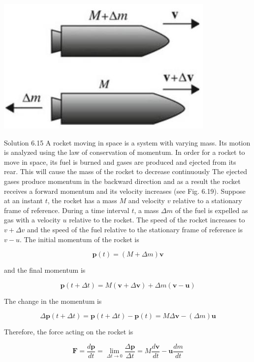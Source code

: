 \documentclass[10pt]{article}
\begin{document}
\begin{center}
\includegraphics[max width=\textwidth]{2024_09_13_db1f357d2aad0a03eb2eg-108}
\end{center}

Solution 6.15 A rocket moving in space is a system with varying mass. Its motion is analyzed using the law of conservation of momentum. In order for a rocket to move in space, its fuel is burned and gases are produced and ejected from its rear. This will cause the mass of the rocket to decrease continuously The ejected gases produce momentum in the backward direction and as a result the rocket receives a forward momentum and its velocity increases (see Fig. 6.19). Suppose at an instant $t$, the rocket has a mass $M$ and velocity $v$ relative to a stationary frame of reference. During a time interval $t$, a mass $\Delta m$ of the fuel is expelled as gas with a velocity $u$ relative to the rocket. The speed of the rocket increases to $v+\Delta v$ and the speed of the fuel relative to the stationary frame of reference is $v-u$. The initial momentum of the rocket is

$$
\mathbf{p}(t)=(M+\Delta m) \mathbf{v}
$$

and the final momentum is

$$
\mathbf{p}(t+\Delta t)=M(\mathbf{v}+\Delta \mathbf{v})+\Delta m(\mathbf{v}-\mathbf{u})
$$

The change in the momentum is

$$
\Delta \mathbf{p}(t+\Delta t)=\mathbf{p}(t+\Delta t)-\mathbf{p}(t)=M \Delta \mathbf{v}-(\Delta m) \mathbf{u}
$$

Therefore, the force acting on the rocket is

$$
\mathbf{F}=\frac{d \mathbf{p}}{d t}=\lim _{\Delta t \rightarrow 0} \frac{\Delta \mathbf{p}}{\Delta t}=M \frac{d \mathbf{v}}{d t}-\mathbf{u} \frac{d m}{d t}
$$
\end{document}
